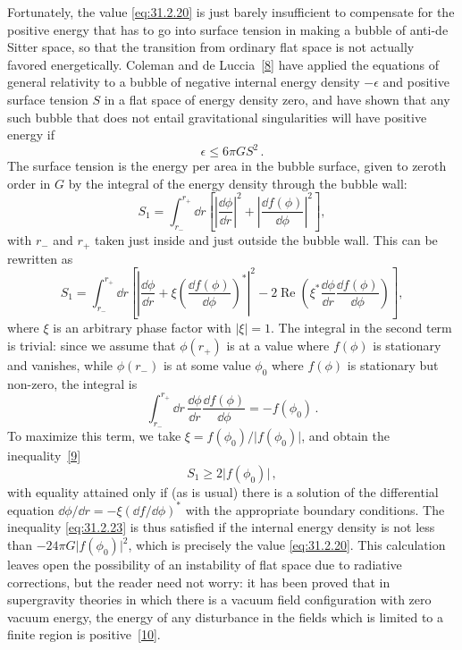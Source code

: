 Fortunately, the value \eqref{eq:31.2.20} is just barely insufficient to
compensate for the positive energy that has to go into surface tension in
making a bubble of anti-de Sitter space, so that the transition from ordinary
flat space is not actually favored energetically. Coleman and de
Luccia~\hyperref[ch31-ref-8]{[8]} have applied the equations of general
relativity to a bubble of negative internal energy density \(-\epsilon\) and
positive surface tension \(S\) in a flat space of energy density zero, and
have shown that any such bubble that does not entail gravitational
singularities will have positive energy if
\begin{equation}
  \epsilon\leq 6\pi GS^2\,.
  \tag{31.2.23}\label{eq:31.2.23}
\end{equation}
The surface tension is the energy per area in the bubble surface, given to
zeroth order in \(G\) by the integral of the energy density through the bubble
wall:
\begin{equation}
  S_1
  =\int_{r_-}^{r_+}\dd r
   \left[
     \left\lvert\frac{\dd\phi}{\dd r}\right\rvert^2
     +\left\lvert\frac{\dd f(\phi)}{\dd\phi}\right\rvert^2
   \right],
  \tag{31.2.24}\label{eq:31.2.24}
\end{equation}
with \(r_-\) and \(r_+\) taken just inside and just outside the bubble wall.
This can be rewritten as
\[
  S_1
  =\int_{r_-}^{r_+}\dd r
   \left[
     \left\lvert
       \frac{\dd\phi}{\dd r}
       +\xi\left(\frac{\dd f(\phi)}{\dd\phi}\right)^*
     \right\rvert^2
     -2\operatorname{Re}\left(
       \xi^*\frac{\dd\phi}{\dd r}\frac{\dd f(\phi)}{\dd\phi}
     \right)
   \right],
\]
where \(\xi\) is an arbitrary phase factor with \(\lvert\xi\rvert=1\). The
integral in the second term is trivial: since we assume that \(\phi(r_+)\) is
at a value where \(f(\phi)\) is stationary and vanishes, while \(\phi(r_-)\)
is at some value \(\phi_0\) where \(f(\phi)\) is stationary but non-zero, the
integral is
\[
  \int_{r_-}^{r_+}\dd r\,
  \frac{\dd\phi}{\dd r}\frac{\dd f(\phi)}{\dd\phi}
  =-f(\phi_0)\,.
\]
To maximize this term, we take
\(\xi=f(\phi_0)/\lvert f(\phi_0)\rvert\), and obtain the
inequality~\hyperref[ch31-ref-9]{[9]}
\begin{equation}
  S_1\geq 2\lvert f(\phi_0)\rvert\,,
  \tag{31.2.25}\label{eq:31.2.25}
\end{equation}
with equality attained only if (as is usual) there is a solution of the
differential equation
\(\dd\phi/\dd r=-\xi(\dd f/\dd\phi)^*\) with the appropriate boundary conditions. The
inequality \eqref{eq:31.2.23} is thus satisfied if the internal energy density
is not less than \(-24\pi G\lvert f(\phi_0)\rvert^2\), which is precisely the
value \eqref{eq:31.2.20}. This calculation leaves open the possibility of an
instability of flat space due to radiative corrections, but the reader need
not worry: it has been proved that in supergravity theories in which there is
a vacuum field configuration with zero vacuum energy, the energy of any
disturbance in the fields which is limited to a finite region is
positive~\hyperref[ch31-ref-10]{[10]}.

